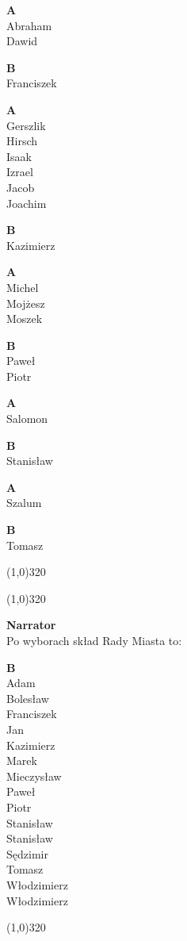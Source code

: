 \documentclass[11pt,a4paper,oneside]{article}
\begin{document}
\textbf{A}\\
Abraham\\
Dawid

\textbf{B}\\
Franciszek

\textbf{A}\\
Gerszlik\\
Hirsch\\
Isaak\\
Izrael\\
Jacob\\
Joachim

\textbf{B}\\
Kazimierz

\textbf{A}\\
Michel\\
Mojżesz\\
Moszek

\textbf{B}\\
Paweł\\
Piotr

\textbf{A}\\
Salomon

\textbf{B}\\
Stanisław

\textbf{A}\\
Szalum

\textbf{B}\\
Tomasz

\line(1,0){320}

\newpage
\line(1,0){320}

\textbf{Narrator}\\
Po wyborach skład Rady Miasta to:

\textbf{B}\\
Adam\\
Bolesław\\
Franciszek\\
Jan\\
Kazimierz\\
Marek\\
Mieczysław\\
Paweł\\
Piotr\\
Stanisław\\
Stanisław\\
Sędzimir\\
Tomasz\\
Włodzimierz\\
Włodzimierz

\line(1,0){320}
\end{document}
